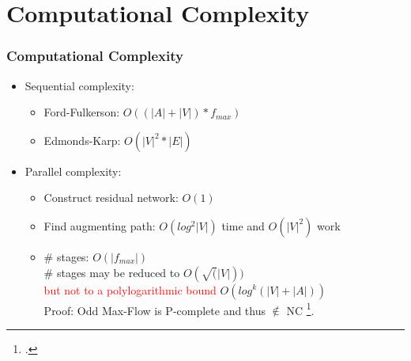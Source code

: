 \documentclass{beamer}
\begin{document}
\section{Computational Complexity}
\begin{frame}
	\frametitle{Computational Complexity}
	\begin{itemize}
		\item Sequential complexity:
		\begin{itemize}
			\item Ford-Fulkerson: $O((|A|+|V|)*f_{max})$
			\item Edmonds-Karp: $O(|V|^{2} * |E|) $
		\end{itemize}
		\pause
		\item Parallel complexity:
		\begin{itemize}
			\item Construct residual network: $O(1)$
			\item Find augmenting path: $O(log^{2}|V|)$ time and $O(|V|^{2})$ work
			\item \# stages: $O(|f_{max}|)$\\
				\# stages may be reduced to $O(\sqrt(|V|))$\\
			  	\textcolor{red}{but not to a polylogarithmic bound} $O(log^{k}(|V| + |A|))$\\
			  	Proof: Odd Max-Flow is P-complete and  thus $\notin$ NC
			  	\footcite{papa95}.
		\end{itemize}			
	\end{itemize}
\end{frame}
\end{document}
